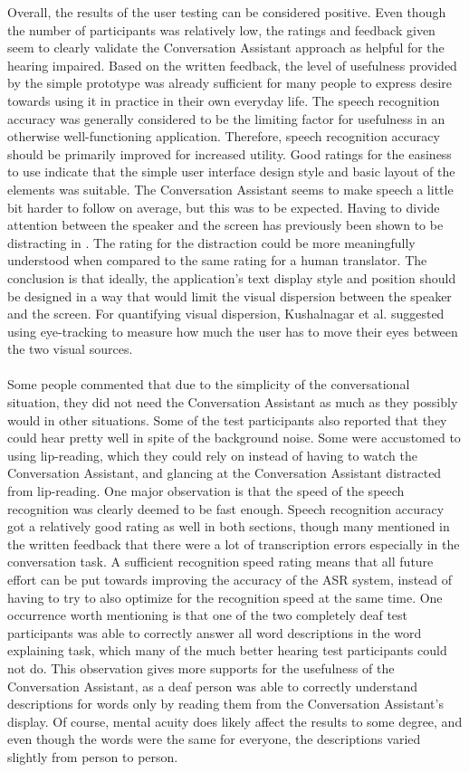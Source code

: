 \documentclass[english, 12pt, a4paper, pdftex, elec, utf8]{aaltothesis}
\begin{document}
Overall, the results of the user testing can be considered positive. Even though the number of participants was relatively low, the ratings and feedback given seem to clearly validate the Conversation Assistant approach as helpful for the hearing impaired. Based on the written feedback, the level of usefulness provided by the simple prototype was already sufficient for many people to express desire towards using it in practice in their own everyday life. The speech recognition accuracy was generally considered to be the limiting factor for usefulness in an otherwise well-functioning application. Therefore, speech recognition accuracy should be primarily improved for increased utility. Good ratings for the easiness to use indicate that the simple user interface design style and basic layout of the elements was suitable. The Conversation Assistant seems to make speech a little bit harder to follow on average, but this was to be expected. Having to divide attention between the speaker and the screen has previously been shown to be distracting in \cite{kushalnagar2015tracked}. The rating for the distraction could be more meaningfully understood when compared to the same rating for a human translator. The conclusion is that ideally, the application's text display style and position should be designed in a way that would limit the visual dispersion between the speaker and the screen. For quantifying visual dispersion, Kushalnagar et al. suggested using eye-tracking to measure how much the user has to move their eyes between the two visual sources. \\\\
Some people commented that due to the simplicity of the conversational situation, they did not need the Conversation Assistant as much as they possibly would in other situations. Some of the test participants also reported that they could hear pretty well in spite of the background noise. Some were accustomed to using lip-reading, which they could rely on instead of having to watch the Conversation Assistant, and glancing at the Conversation Assistant distracted from lip-reading. One major observation is that the speed of the speech recognition was clearly deemed to be fast enough. Speech recognition accuracy got a relatively good rating as well in both sections, though many mentioned in the written feedback that there were a lot of transcription errors especially in the conversation task. A sufficient recognition speed rating means that all future effort can be put towards improving the accuracy of the ASR system, instead of having to try to also optimize for the recognition speed at the same time. One occurrence worth mentioning is that one of the two completely deaf test participants was able to correctly answer all word descriptions in the word explaining task, which many of the much better hearing test participants could not do. This observation gives more supports for the usefulness of the Conversation Assistant, as a deaf person was able to correctly understand descriptions for words only by reading them from the Conversation Assistant's display. Of course, mental acuity does likely affect the results to some degree, and even though the words were the same for everyone, the descriptions varied slightly from person to person. \\\\
\end{document}
